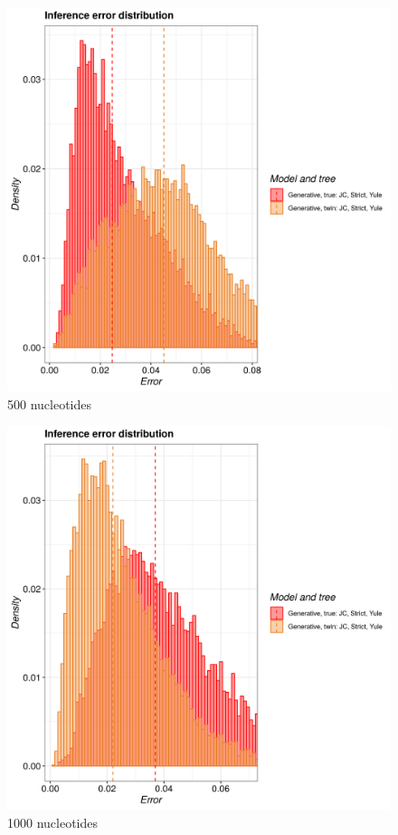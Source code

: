 \begin{figure}[H]
  \includegraphics[width=\textwidth]{pirouette_example_21/example_21_316/errors.png}
  \caption{500 nucleotides}
\end{figure}

\begin{figure}[H]
  \includegraphics[width=\textwidth]{pirouette_example_21/example_21_317/errors.png}
  \caption{1000 nucleotides}
\end{figure}

